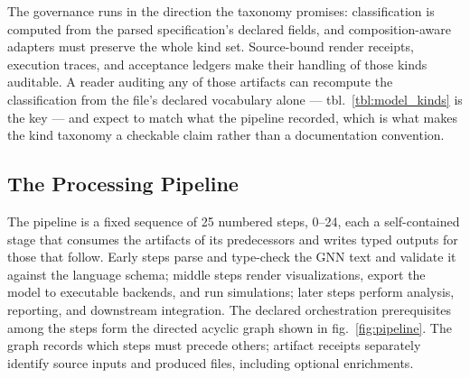 \documentclass[
  english,
  9pt,
]{extarticle}
\begin{document}
The governance runs in the direction the taxonomy promises:
classification is computed from the parsed specification's declared
fields, and composition-aware adapters must preserve the whole kind set.
Source-bound render receipts, execution traces, and acceptance ledgers
make their handling of those kinds auditable. A reader auditing any of
those artifacts can recompute the classification from the file's
declared vocabulary alone --- tbl.~\ref{tbl:model_kinds} is the key ---
and expect to match what the pipeline recorded, which is what makes the
kind taxonomy a checkable claim rather than a documentation convention.

\subsection{The Processing Pipeline}\label{the-processing-pipeline}

The pipeline is a fixed sequence of 25 numbered steps, 0--24, each a
self-contained stage that consumes the artifacts of its predecessors and
writes typed outputs for those that follow. Early steps parse and
type-check the GNN text and validate it against the language schema;
middle steps render visualizations, export the model to executable
backends, and run simulations; later steps perform analysis, reporting,
and downstream integration. The declared orchestration prerequisites
among the steps form the directed acyclic graph shown in
fig.~\ref{fig:pipeline}. The graph records which steps must precede
others; artifact receipts separately identify source inputs and produced
files, including optional enrichments.
\end{document}
